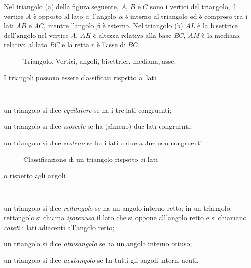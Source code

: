 Nel triangolo (a) della figura seguente, $A$, $B$ e $C$ sono i 
vertici del triangolo, il vertice $A$ è opposto al lato $a$, l'angolo 
$\alpha$ è interno al triangolo ed è compreso tra i lati $AB$ e $AC$, 
mentre l'angolo $\beta$ è esterno. Nel triangolo (b) $AL$ è la 
bisettrice dell'angolo nel vertice $A$, $AH$ è altezza relativa alla 
base $BC$, $AM$ è la mediana relativa al lato $BC$ e la retta $r$ è 
l'asse di $BC$.


\begin{inaccessibleblock}
 \begin{figure}[htb]
\centering
\caption{Triangolo. Vertici, angoli, bisettrice, mediana, asse.}
\label{fig:triangolo1}
\end{figure}
\end{inaccessibleblock}

I triangoli possono essere classificati rispetto ai lati
\begin{definizione}~
\begin{itemize*}
\item un triangolo si dice \emph{equilatero} se ha i tre lati 
congruenti;
\item un triangolo si dice \emph{isoscele} se ha (almeno) due lati 
congruenti;
\item un triangolo si dice \emph{scaleno} se ha i lati a due a due 
non congruenti.
\end{itemize*}
\end{definizione}


\begin{inaccessibleblock}
 \begin{figure}[htb]
\centering
\caption{Classificazione di un triangolo rispetto ai 
lati}\label{fig:class_triangolo_lati}
\end{figure}
\end{inaccessibleblock}

\noindent o rispetto agli angoli
\begin{definizione}~
\begin{itemize*}
\item un triangolo si dice \emph{rettangolo} se ha un angolo interno 
retto; in un triangolo rettangolo si chiama \emph{ipotenusa} il lato 
che si oppone all'angolo retto e si chiamano \emph{cateti} i lati 
adiacenti all'angolo retto;
\item un triangolo si dice \emph{ottusangolo} se ha un angolo interno 
ottuso;
\item un triangolo si dice \emph{acutangolo} se ha tutti gli angoli 
interni acuti.
\end{itemize*}
\end{definizione}



